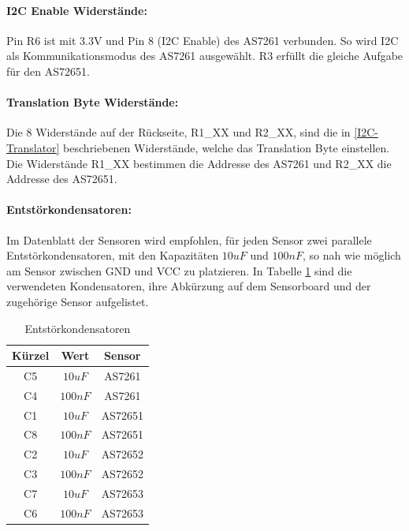 \paragraph{I2C Enable Widerstände:} Pin R6 ist mit 3.3V und Pin 8 (I2C Enable) des AS7261 verbunden. So wird 
I2C als Kommunikationsmodus des AS7261 ausgewählt.
	R3 erfüllt die gleiche Aufgabe für den AS72651.
	
\paragraph{Translation Byte Widerstände:}
Die 8 Widerstände auf der Rückseite, R1\_XX und R2\_XX, sind die in \ref{I2C-Translator} beschriebenen Widerstände, welche das Translation Byte einstellen. Die Widerstände R1\_XX bestimmen die Addresse des AS7261 und R2\_XX die Addresse des AS72651.

\paragraph{Entstörkondensatoren:} Im Datenblatt der Sensoren wird empfohlen, für jeden Sensor zwei parallele Entstörkondensatoren, mit den Kapazitäten $10uF$ und $100nF$, so nah wie möglich am Sensor zwischen GND und VCC zu platzieren. In Tabelle \ref{kondi} sind die verwendeten Kondensatoren, ihre Abkürzung auf dem Sensorboard und der zugehörige Sensor aufgelistet.

\begin{table}[H]
\centering
\begin{tabular}{ c | c | c }
 Kürzel & Wert & Sensor \\ 
 \hline
 C5 & $10uF$ & AS7261 \\  
 C4 & $100nF$ & AS7261 \\
 C1 & $10uF$ & AS72651 \\  
 C8 & $100nF$ & AS72651 \\
 C2 & $10uF$ & AS72652 \\  
 C3 & $100nF$ & AS72652 \\
 C7 & $10uF$ & AS72653 \\  
 C6 & $100nF$ & AS72653 \\
\end{tabular}
\caption{Entstörkondensatoren}
\label{kondi}
\end{table}

